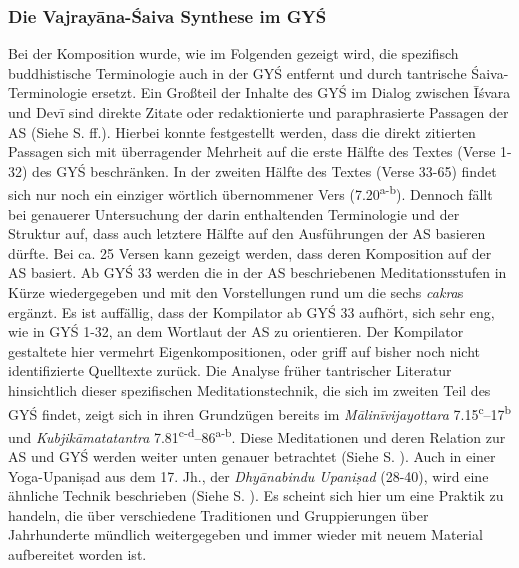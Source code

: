 \documentclass[a4paper,12pt]{article}
\begin{document}
{\subsubsection{Die Vajrayāna-Śaiva Synthese im GYŚ}
Bei der Komposition wurde, wie im Folgenden gezeigt wird, die spezifisch buddhistische Terminologie auch in der GYŚ entfernt und durch tantrische Śaiva-Terminologie ersetzt. Ein Großteil der Inhalte des GYŚ im Dialog zwischen Īśvara und Devī sind direkte Zitate oder redaktionierte und paraphrasierte Passagen der AS (Siehe S.\pageref{tabelle} ff.). Hierbei konnte festgestellt werden, dass die direkt zitierten Passagen sich mit überragender Mehrheit auf die erste Hälfte des Textes (Verse 1-32) des GYŚ beschränken. In der zweiten Hälfte des Textes (Verse 33-65) findet sich nur noch ein einziger wörtlich übernommener Vers (7.20\textsuperscript{a-b}). Dennoch fällt bei genauerer Untersuchung der darin enthaltenden Terminologie und der Struktur auf, dass auch letztere Hälfte auf den Ausführungen der AS basieren dürfte. Bei ca. 25 Versen kann gezeigt werden, dass deren Komposition auf der AS basiert. Ab GYŚ 33 werden die in der AS beschriebenen Meditationsstufen in Kürze wiedergegeben und mit den Vorstellungen rund um die sechs \textit{cakra}s ergänzt. Es ist auffällig, dass der Kompilator ab GYŚ 33 aufhört, sich sehr eng, wie in GYŚ 1-32, an dem Wortlaut der AS zu orientieren. Der Kompilator gestaltete hier vermehrt Eigenkompositionen, oder griff auf bisher noch nicht identifizierte Quelltexte zurück. Die Analyse früher tantrischer Literatur hinsichtlich dieser spezifischen Meditationstechnik, die sich im zweiten Teil des GYŚ findet, zeigt sich in ihren Grundzügen bereits im \textit{Mālinīvijayottara} 7.15\textsuperscript{c}–17\textsuperscript{b} und \textit{Kubjikāmatatantra} 7.81\textsuperscript{c-d}–86\textsuperscript{a-b}. Diese Meditationen und deren Relation zur AS und GYŚ werden weiter unten genauer betrachtet (Siehe S. \pageref{medi}). Auch in einer Yoga-Upaniṣad aus dem 17. Jh., der \textit{Dhyānabindu Upaniṣad} (28-40), wird eine ähnliche Technik beschrieben (Siehe S. \pageref{dhbu}). Es scheint sich hier um eine Praktik zu handeln, die über verschiedene Traditionen und Gruppierungen über Jahrhunderte mündlich weitergegeben und immer wieder mit neuem Material aufbereitet worden ist.  

}
\end{document}
